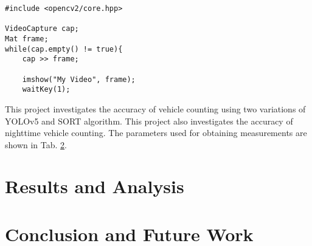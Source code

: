 \documentclass[12pt,a4paper,fleqn]{report}
\begin{document}
\begin{verbatim}
#include <opencv2/core.hpp>

VideoCapture cap;
Mat frame;
while(cap.empty() != true){ 
    cap >> frame; 
    
    imshow("My Video", frame);
    waitKey(1);
\end{verbatim}

This project investigates the accuracy of vehicle counting using two variations of YOLOv5 and SORT
algorithm. 
This project also investigates the accuracy of nighttime vehicle counting. 
The parameters used for obtaining measurements are shown in Tab. \ref{}.

\chapter{Results and Analysis}

\chapter{Conclusion and Future Work}


{}
\end{document}
